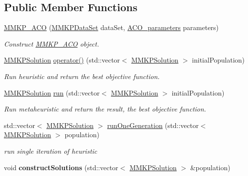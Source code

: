 \subsection*{Public Member Functions}
\begin{DoxyCompactItemize}
\item 
\hyperlink{class_m_m_k_p___a_c_o_af3316df74f8ea3334dc97cde7791cbd2}{M\+M\+K\+P\+\_\+\+A\+C\+O} (\hyperlink{class_m_m_k_p_data_set}{M\+M\+K\+P\+Data\+Set} data\+Set, \hyperlink{class_a_c_o__parameters}{A\+C\+O\+\_\+parameters} parameters)
\begin{DoxyCompactList}\small\item\em Construct \hyperlink{class_m_m_k_p___a_c_o}{M\+M\+K\+P\+\_\+\+A\+C\+O} object. \end{DoxyCompactList}\item 
\hyperlink{class_m_m_k_p_solution}{M\+M\+K\+P\+Solution} \hyperlink{class_m_m_k_p___a_c_o_a0d8af29cc503c3f97788af97611d64ae}{operator()} (std\+::vector$<$ \hyperlink{class_m_m_k_p_solution}{M\+M\+K\+P\+Solution} $>$ initial\+Population)
\begin{DoxyCompactList}\small\item\em Run heuristic and return the best objective function. \end{DoxyCompactList}\item 
\hypertarget{class_m_m_k_p___a_c_o_ab2625fe1df6ac86a20f50e6bb684019a}{\hyperlink{class_m_m_k_p_solution}{M\+M\+K\+P\+Solution} \hyperlink{class_m_m_k_p___a_c_o_ab2625fe1df6ac86a20f50e6bb684019a}{run} (std\+::vector$<$ \hyperlink{class_m_m_k_p_solution}{M\+M\+K\+P\+Solution} $>$ initial\+Population)}\label{class_m_m_k_p___a_c_o_ab2625fe1df6ac86a20f50e6bb684019a}

\begin{DoxyCompactList}\small\item\em Run metaheuristic and return the result, the best objective function. \end{DoxyCompactList}\item 
\hypertarget{class_m_m_k_p___a_c_o_a704424aad2dcfd78c1643ef808da0d3d}{std\+::vector$<$ \hyperlink{class_m_m_k_p_solution}{M\+M\+K\+P\+Solution} $>$ \hyperlink{class_m_m_k_p___a_c_o_a704424aad2dcfd78c1643ef808da0d3d}{run\+One\+Generation} (std\+::vector$<$ \hyperlink{class_m_m_k_p_solution}{M\+M\+K\+P\+Solution} $>$ population)}\label{class_m_m_k_p___a_c_o_a704424aad2dcfd78c1643ef808da0d3d}

\begin{DoxyCompactList}\small\item\em run single iteration of heuristic \end{DoxyCompactList}\item 
\hypertarget{class_m_m_k_p___a_c_o_a3ef620f8c9d2eee75bfbce33976398ee}{void {\bfseries construct\+Solutions} (std\+::vector$<$ \hyperlink{class_m_m_k_p_solution}{M\+M\+K\+P\+Solution} $>$ \&population)}\label{class_m_m_k_p___a_c_o_a3ef620f8c9d2eee75bfbce33976398ee}


\end{DoxyCompactItemize}
